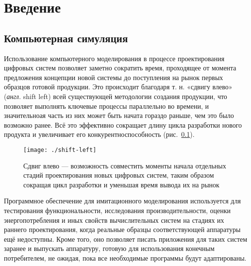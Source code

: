 \chapter*{Введение}\label{chap:overview}



\section{Компьютерная симуляция}

Использование компьютерного моделирования в процессе проектирования цифровых систем позволяет заметно сократить время, проходящее от момента предложения концепции новой системы до поступления на рынок первых образцов готовой продукции. Это происходит благодаря т. н. «сдвигу влево» (\textit{англ.} shift left) всей существующей методологии создания продукции, что позволяет выполнять ключевые процессы параллельно во времени, и значительноая часть из них может быть начата гораздо раньше, чем это было возможно ранее. Всё это эффективно сокращает длину цикла разработки нового продукта и увеличивает его конкурентноспособность (рис.~\ref{fig:shift-left}).

\begin{figure}[htb]
    \centering
    \texttt{[image: ./shift-left]}
    \caption[Сдвиг влево]{Сдвиг влево --- возможность совместить моменты начала отдельных стадий проектирования новых цифровых систем, таким образом сокращая цикл разработки и уменьшая время вывода их на рынок}
    \label{fig:shift-left}
\end{figure}

Программное обеспечение для имитационного моделирования используется для тестирования функциональности, исследования производительности, оценки энергопотребления и иных свойств вычислительных систем на стадиях их раннего проектирования, когда реальные образцы соответствующей аппаратуры ещё недоступны. Кроме того, оно позволяет писать приложения для таких систем заранее и выпускать аппаратуру, готовую для использования конечным потребителем, не ожидая, пока все необходимые программы будут адаптированы.

